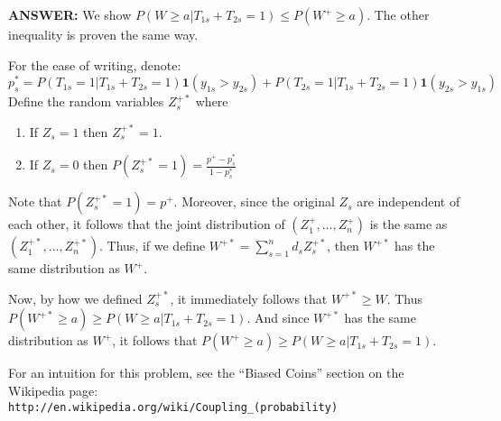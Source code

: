 \documentclass{article}
\begin{document}
\begin{itemize}
\begin{itemize}
          \textbf{ANSWER:}
            We show $P(W\geq a | T_{1s} + T_{2s} = 1) \leq P(W^+ \geq a)$. 
            The other inequality is proven the same way.
            
            For the ease of writing, denote:
            $$ p^*_s = P(T_{1s} = 1|T_{1s} + T_{2s} =1)\mathbf1(y_{1s} > y_{2s})
              + P(T_{2s} = 1|T_{1s} + T_{2s} =1)\mathbf1(y_{2s} > y_{1s})
            $$
            Define the random variables $Z_s^{+*}$ where
            \begin{enumerate}
              \item If $Z_s = 1$ then $Z_s^{+*} = 1$.
              \item If $Z_s = 0$ then $P(Z_s^{+*} = 1) = \frac{p^+ - p_s^*}{1-p^*_s}$
            \end{enumerate}
            Note that $P(Z_s^{+*} = 1) = p^+$.
            Moreover, since the original $Z_s$ are independent of each other,
            it follows that the joint distribution of $(Z_1^+,\ldots,Z_n^+)$ is the same
            as $(Z_1^{+*},\ldots,Z_n^{+*})$.
            Thus, if we define $W^{+*} = \sum_{s=1}^n d_s Z^{+*}_s $,
            then $W^{+*}$ has the same distribution as $W^{+}$.
            
            Now, by how we defined $Z_s^{+*}$, it immediately follows that
            $W^{+*} \geq W$.
            Thus $P(W^{+*}  \geq a) \geq P(W \geq a| T_{1s} + T_{2s} = 1)$.
            And since $W^{+*}$ has the same distribution as $W^{+}$,
            it follows that
            $P(W^{+}  \geq a) \geq P(W \geq a| T_{1s} + T_{2s} = 1)$.
                       
            For an intuition for this problem, see the 
            ``Biased Coins'' section on the Wikipedia page:\\
            \verb|http://en.wikipedia.org/wiki/Coupling_(probability)|
            
                        
      \end{itemize}
  \end{itemize}  
\end{document}
